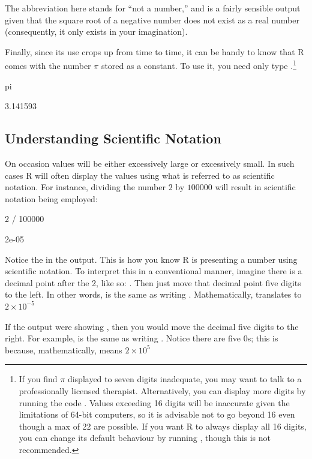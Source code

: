 The abbreviation  here stands for ``not a number,'' and is a fairly sensible output given that the square root of a negative number does not exist as a real number (consequently, it only exists in your imagination).

Finally, since its use crops up from time to time, it can be handy to know that R comes with the number $\pi$ stored as a constant. To use it, you need only type .\footnote{If you find $\pi$ displayed to seven digits inadequate, you may want to talk to a professionally licensed therapist. Alternatively, you can display more digits by running the code . Values exceeding 16 digits will be inaccurate given the limitations of 64-bit computers, so it is advisable not to go beyond 16 even though a max of 22 are possible. If you want R to always display all 16 digits, you can change its default behaviour by running , though this is not recommended.}

\begin{inR}
pi
\end{inR}
\begin{outR}
[1] 3.141593
\end{outR}

\subsection{Understanding Scientific Notation}

On occasion values will be either excessively large or excessively small. In such cases R will often display the values using what is referred to as \gls{scientific notation}.  For instance, dividing the number $2$ by $100000$ will result in scientific notation being employed:

\begin{inR}
2 / 100000
\end{inR}
\begin{outR}
[1] 2e-05
\end{outR}

Notice the  in the output. This is how you know R is presenting a number using scientific notation. To interpret this in a conventional manner, imagine there is a decimal point after the 2, like so: . Then just move that decimal point five digits to the left. In other words,  is the same as writing . Mathematically,  translates to $2 \times 10^{-5}$

If the output were showing , then you would move the decimal five digits to the right. For example,  is the same as writing . Notice there are five 0s; this is because, mathematically,  means $2 \times 10^5$

